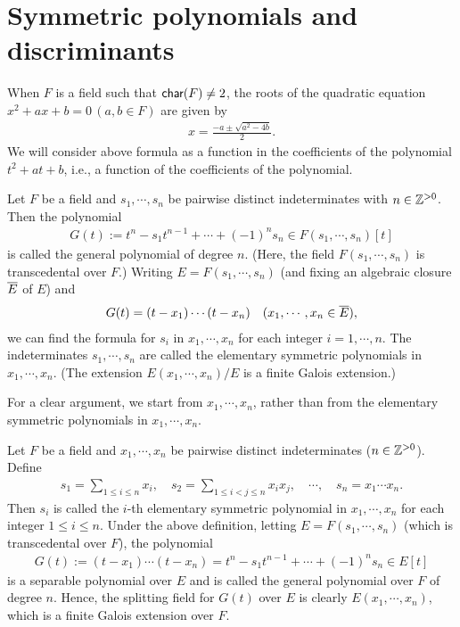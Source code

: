\section{Symmetric polynomials and discriminants}

\begin{rmk}
    When $F$ is a field such that ${\textsf{char}({F})}\neq 2$, the roots of the quadratic equation $x^2+ax+b=0\,(a, b\in F)$ are given by
    \begin{align*}
        x=\frac{-a\pm\sqrt{a^2-4b}}{2}.
    \end{align*}
    We will consider above formula as a function in the coefficients of the polynomial $t^2+at+b$, i.e., a function of the coefficients of the polynomial.
\end{rmk}

\begin{obs}
    Let $F$ be a field and $s_1, \cdots, s_n$ be pairwise distinct indeterminates with $n\in{\mathbb{Z}}^{>0}$.
    Then the polynomial
    \begin{align*}
        G(t):=t^n-s_1t^{n-1}+\cdots+(-1)^ns_n\in F(s_1, \cdots, s_n)[t]
    \end{align*}
    is called the general polynomial of degree $n$.
    (Here, the field $F(s_1, \cdots, s_n)$ is transcedental over $F$.)
    Writing $E=F(s_1, \cdots, s_n)$ (and fixing an algebraic closure $\overline{E}$ of $E$) and
    \begin{align*}
        G(t)=(t-x_1)\cdots(t-x_n)\quad (x_1, \cdots, x_n\in \overline{E}),
    \end{align*}
    we can find the formula for $s_i$ in $x_1, \cdots, x_n$ for each integer $i=1, \cdots, n$.
    The indeterminates $s_1, \cdots, s_n$ are called the elementary symmetric polynomials in $x_1, \cdots, x_n$.
    (The extension $E(x_1, \cdots, x_n)/E$ is a finite Galois extension.)
\end{obs}
For a clear argument, we start from $x_1, \cdots, x_n$, rather than from the elementary symmetric polynomials in $x_1, \cdots, x_n$.
\begin{defi}
    Let $F$ be a field and $x_1, \cdots, x_n$ be pairwise distinct indeterminates ($n\in{\mathbb{Z}}^{>0}$).
    Define
    \begin{align*}
        s_1=\sum_{1\leq i\leq n} x_i,\quad s_2=\sum_{1\leq i<j\leq n} x_ix_j,\quad\cdots, \quad s_n=x_1\cdots x_n.
    \end{align*}
    Then $s_i$ is called the $i$-th elementary symmetric polynomial in $x_1, \cdots, x_n$ for each integer $1\leq i\leq n$.
    Under the above definition, letting $E=F(s_1, \cdots, s_n)$ (which is transcedental over $F$), the polynomial
    \begin{align*}
        G(t):=(t-x_1)\cdots(t-x_n)=t^n-s_1t^{n-1}+\cdots+(-1)^ns_n\in E[t]
    \end{align*}
    is a separable polynomial over $E$ and is called the general polynomial over $F$ of degree $n$.
    Hence, the splitting field for $G(t)$ over $E$ is clearly $E(x_1, \cdots, x_n)$, which is a finite Galois extension over $F$.
\end{defi}

